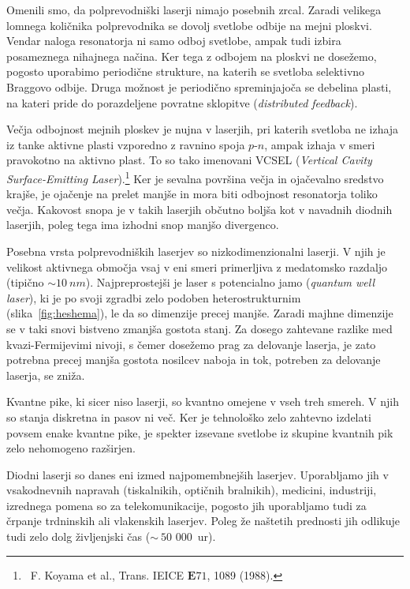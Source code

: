 \begin{remark}
Omenili smo, da polprevodniški laserji nimajo posebnih zrcal. Zaradi velikega lomnega
količnika polprevodnika se dovolj svetlobe odbije na mejni ploskvi. Vendar naloga resonatorja ni 
samo odboj svetlobe, ampak tudi izbira posameznega nihajnega načina. Ker tega z odbojem 
na ploskvi ne dosežemo, pogosto uporabimo periodične strukture, na katerih se svetloba selektivno
Braggovo odbije. Druga možnost je periodično spreminjajoča se debelina plasti, na kateri pride
do porazdeljene povratne sklopitve ({\it distributed feedback}). 
 
Večja odbojnost mejnih ploskev je nujna v laserjih, pri katerih svetloba ne izhaja iz
tanke aktivne plasti vzporedno z ravnino spoja $p$-$n$, ampak izhaja v smeri pravokotno na aktivno plast.
To so tako imenovani VCSEL ({\it Vertical Cavity Surface-Emitting 
Laser}).\footnote{~F. Koyama et al., Trans. IEICE ${\mathbf E71}$, 1089 (1988).} Ker je sevalna površina večja in 
ojačevalno sredstvo krajše, je ojačenje na prelet manjše in mora biti odbojnost resonatorja toliko večja. 
Kakovost snopa je v takih laserjih občutno boljša kot v navadnih diodnih laserjih, poleg tega ima izhodni 
snop manjšo divergenco.
\end{remark}

\begin{remark}
Posebna vrsta polprevodniških laserjev so nizkodimenzionalni laserji. V njih je 
velikost aktivnega območja vsaj v eni smeri primerljiva z medatomsko razdaljo (tipično $\sim 10~\si{nm}$).
Najpreprostejši je laser s potencialno jamo ({\it quantum well laser}), ki 
je po svoji zgradbi zelo podoben heterostrukturnim (slika~\ref{fig:heshema}), le da so dimenzije precej
manjše. Zaradi majhne dimenzije se v taki snovi bistveno zmanjša gostota stanj. 
Za dosego zahtevane razlike med kvazi-Fermijevimi nivoji, s čemer dosežemo prag za delovanje laserja,
je zato potrebna precej manjša gostota nosilcev naboja in tok, potreben za delovanje laserja,
se zniža. 

Kvantne pike, ki sicer niso laserji, so kvantno omejene v vseh treh smereh.
V njih so stanja diskretna in pasov ni več. Ker je tehnološko zelo zahtevno izdelati povsem enake
kvantne pike, je spekter izsevane svetlobe iz skupine kvantnih pik zelo nehomogeno razširjen. 
\end{remark}

Diodni laserji so danes eni izmed najpomembnejših laserjev. Uporabljamo jih v vsakodnevnih napravah 
(tiskalnikih, optičnih bralnikih), medicini, industriji, izrednega
pomena so za telekomunikacije, pogosto jih uporabljamo tudi za 
črpanje trdninskih ali vlakenskih laserjev. 
Poleg že naštetih prednosti jih odlikuje tudi zelo dolg življenjski čas 
($\sim~50\,\,000$~ur). 
\newpage

